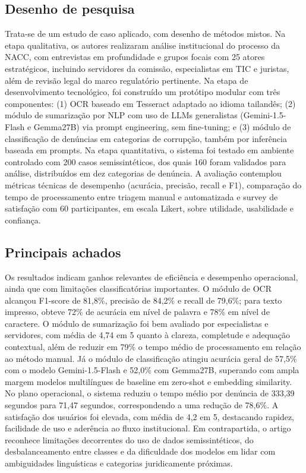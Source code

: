 \documentclass[12pt,a4paper]{article}
\begin{document}
\subsection{Desenho de pesquisa}
\label{sec:orgb0471cf}

Trata-se de um estudo de caso aplicado, com desenho de métodos mistos. Na etapa qualitativa, os autores realizaram análise institucional do processo da NACC, com entrevistas em profundidade e grupos focais com 25 atores estratégicos, incluindo servidores da comissão, especialistas em TIC e juristas, além de revisão legal do marco regulatório pertinente. Na etapa de desenvolvimento tecnológico, foi construído um protótipo modular com três componentes: (1) OCR baseado em Tesseract adaptado ao idioma tailandês; (2) módulo de sumarização por NLP com uso de LLMs generalistas (Gemini-1.5-Flash e Gemma27B) via prompt engineering, sem fine-tuning; e (3) módulo de classificação de denúncias em categorias de corrupção, também por inferência baseada em prompts. Na etapa quantitativa, o sistema foi testado em ambiente controlado com 200 casos semissintéticos, dos quais 160 foram validados para análise, distribuídos em dez categorias de denúncia. A avaliação contemplou métricas técnicas de desempenho (acurácia, precisão, recall e F1), comparação do tempo de processamento entre triagem manual e automatizada e survey de satisfação com 60 participantes, em escala Likert, sobre utilidade, usabilidade e confiança.

\subsection{Principais achados}
\label{sec:org47af376}

Os resultados indicam ganhos relevantes de eficiência e desempenho operacional, ainda que com limitações classificatórias importantes. O módulo de OCR alcançou F1-score de 81,8\%, precisão de 84,2\% e recall de 79,6\%; para texto impresso, obteve 72\% de acurácia em nível de palavra e 78\% em nível de caractere. O módulo de sumarização foi bem avaliado por especialistas e servidores, com média de 4,74 em 5 quanto à clareza, completude e adequação contextual, além de reduzir em 79\% o tempo médio de processamento em relação ao método manual. Já o módulo de classificação atingiu acurácia geral de 57,5\% com o modelo Gemini-1.5-Flash e 52,0\% com Gemma27B, superando com ampla margem modelos multilíngues de baseline em zero-shot e embedding similarity. No plano operacional, o sistema reduziu o tempo médio por denúncia de 333,39 segundos para 71,47 segundos, correspondendo a uma redução de 78,6\%. A satisfação dos usuários foi elevada, com média de 4,2 em 5, destacando rapidez, facilidade de uso e aderência ao fluxo institucional. Em contrapartida, o artigo reconhece limitações decorrentes do uso de dados semissintéticos, do desbalanceamento entre classes e da dificuldade dos modelos em lidar com ambiguidades linguísticas e categorias juridicamente próximas.
\end{document}
